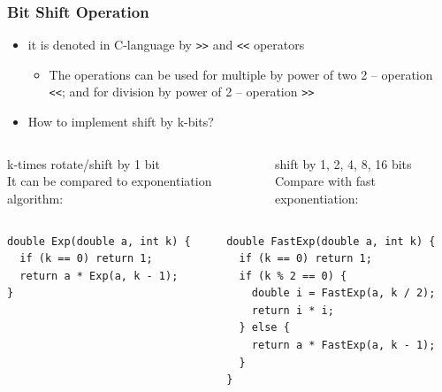 \documentclass{beamer}
\begin{document}
\begin{frame}[fragile,shrink=5]
\frametitle{Bit Shift Operation}

\begin{itemize}
\item it is denoted in C-language by \texttt{>>} and \texttt{<<} operators
\begin{itemize}
\item The operations can be used for multiple by power of two 2 -- operation \texttt{<<}; and for division by power of 2 -- operation \texttt{>>}
\end{itemize}
\item How to implement shift by k-bits?
\end{itemize}
\begin{columns}
\begin{column}{0.48\textwidth}
k-times rotate/shift by 1 bit\\
It can be compared to exponentiation algorithm:
\end{column}
\begin{column}{0.52\textwidth}
shift by 1, 2, 4, 8, 16 bits\\
Compare with fast exponentiation:
\end{column}
\end{columns}

\begin{columns}
\begin{column}{0.48\textwidth}
\begin{verbatim}
double Exp(double a, int k) {
  if (k == 0) return 1;
  return a * Exp(a, k - 1);
}
\end{verbatim}
\end{column}
\begin{column}{0.52\textwidth}
\begin{verbatim}
double FastExp(double a, int k) {
  if (k == 0) return 1;
  if (k % 2 == 0) {
    double i = FastExp(a, k / 2);
    return i * i;
  } else {
    return a * FastExp(a, k - 1);
  }
}
\end{verbatim}

\end{column}
\end{columns}



\end{frame}
\end{document}
